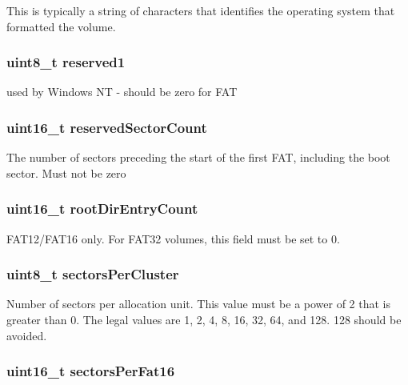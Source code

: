 This is typically a string of characters that identifies the operating system that formatted the volume. \hypertarget{structfat32__boot_a2a2556147677ece60b8aadf4a0d608ed}{
\subsubsection[{reserved1}]{\setlength{\rightskip}{0pt plus 5cm}uint8\-\_\-t reserved1}}\label{structfat32__boot_a2a2556147677ece60b8aadf4a0d608ed}
used by Windows N\-T -\/ should be zero for F\-A\-T \hypertarget{structfat32__boot_a16c854faf567331bbbfb383e6c8df6f5}{
\subsubsection[{reserved\-Sector\-Count}]{\setlength{\rightskip}{0pt plus 5cm}uint16\-\_\-t reserved\-Sector\-Count}}\label{structfat32__boot_a16c854faf567331bbbfb383e6c8df6f5}
The number of sectors preceding the start of the first F\-A\-T, including the boot sector. Must not be zero \hypertarget{structfat32__boot_aabe25e54b9c06a9a7393fc6c475d9fa1}{
\subsubsection[{root\-Dir\-Entry\-Count}]{\setlength{\rightskip}{0pt plus 5cm}uint16\-\_\-t root\-Dir\-Entry\-Count}}\label{structfat32__boot_aabe25e54b9c06a9a7393fc6c475d9fa1}
F\-A\-T12/\-F\-A\-T16 only. For F\-A\-T32 volumes, this field must be set to 0. \hypertarget{structfat32__boot_a3ce07376c286acd8393a18a32d7ca4c0}{
\subsubsection[{sectors\-Per\-Cluster}]{\setlength{\rightskip}{0pt plus 5cm}uint8\-\_\-t sectors\-Per\-Cluster}}\label{structfat32__boot_a3ce07376c286acd8393a18a32d7ca4c0}
Number of sectors per allocation unit. This value must be a power of 2 that is greater than 0. The legal values are 1, 2, 4, 8, 16, 32, 64, and 128. 128 should be avoided. \hypertarget{structfat32__boot_abf85d1c57b01c8901a0cdcd0ac1babc2}{
\subsubsection[{sectors\-Per\-Fat16}]{\setlength{\rightskip}{0pt plus 5cm}uint16\-\_\-t sectors\-Per\-Fat16}}\label{structfat32__boot_abf85d1c57b01c8901a0cdcd0ac1babc2}
